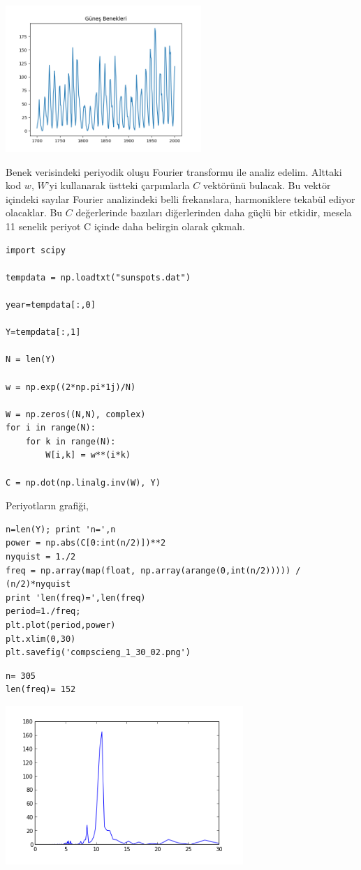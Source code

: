 \documentclass[12pt,fleqn]{article}\usepackage{../../common}
\begin{document}
\includegraphics[width=20em]{compscieng_1_30_03.png}

Benek verisindeki periyodik oluşu Fourier transformu ile analiz
edelim. Alttaki kod $w$, $W$'yi kullanarak üstteki çarpımlarla $C$
vektörünü bulacak. Bu vektör içindeki sayılar Fourier analizindeki belli
frekanslara, harmoniklere tekabül ediyor olacaklar. Bu $C$ değerlerinde
bazıları diğerlerinden daha güçlü bir etkidir, mesela 11 senelik periyot C
içinde daha belirgin olarak çıkmalı.

\begin{verbatim}
import scipy

tempdata = np.loadtxt("sunspots.dat")

year=tempdata[:,0]

Y=tempdata[:,1]

N = len(Y)

w = np.exp((2*np.pi*1j)/N)

W = np.zeros((N,N), complex)
for i in range(N):
    for k in range(N):
        W[i,k] = w**(i*k)
        
C = np.dot(np.linalg.inv(W), Y) 
\end{verbatim}

Periyotların grafiği,

\begin{verbatim}
n=len(Y); print 'n=',n
power = np.abs(C[0:int(n/2)])**2
nyquist = 1./2
freq = np.array(map(float, np.array(arange(0,int(n/2))))) / (n/2)*nyquist
print 'len(freq)=',len(freq)
period=1./freq;
plt.plot(period,power)
plt.xlim(0,30)
plt.savefig('compscieng_1_30_02.png')
\end{verbatim}

\begin{verbatim}
n= 305
len(freq)= 152
\end{verbatim}

\includegraphics[height=6cm]{compscieng_1_30_02.png}
\end{document}
